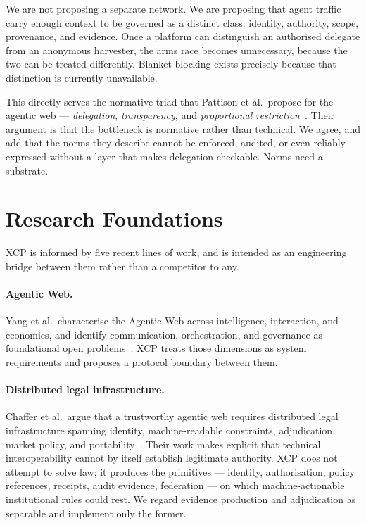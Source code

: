 \documentclass[11pt]{article}
\begin{document}
We are not proposing a separate network. We are proposing that agent traffic
carry enough context to be governed as a distinct class: identity, authority,
scope, provenance, and evidence. Once a platform can distinguish an authorised
delegate from an anonymous harvester, the arms race becomes unnecessary, because
the two can be treated differently. Blanket blocking exists precisely because
that distinction is currently unavailable.

This directly serves the normative triad that Pattison et al.\ propose for the
agentic web --- \emph{delegation}, \emph{transparency}, and \emph{proportional
restriction}~\cite{pattison2026}. Their argument is that the bottleneck is
normative rather than technical. We agree, and add that the norms they describe
cannot be enforced, audited, or even reliably expressed without a layer that
makes delegation checkable. Norms need a substrate.

\section{Research Foundations}

XCP is informed by five recent lines of work, and is intended as an engineering
bridge between them rather than a competitor to any.

\paragraph{Agentic Web.}
Yang et al.\ characterise the Agentic Web across intelligence, interaction, and
economics, and identify communication, orchestration, and governance as
foundational open problems~\cite{yang2025}. XCP treats those dimensions as system
requirements and proposes a protocol boundary between them.

\paragraph{Distributed legal infrastructure.}
Chaffer et al.\ argue that a trustworthy agentic web requires distributed legal
infrastructure spanning identity, machine-readable constraints, adjudication,
market policy, and portability~\cite{chaffer2026}. Their work makes explicit that
technical interoperability cannot by itself establish legitimate authority. XCP
does not attempt to solve law; it produces the primitives --- identity,
authorisation, policy references, receipts, audit evidence, federation --- on
which machine-actionable institutional rules could rest. We regard evidence
production and adjudication as separable and implement only the former.
\end{document}
